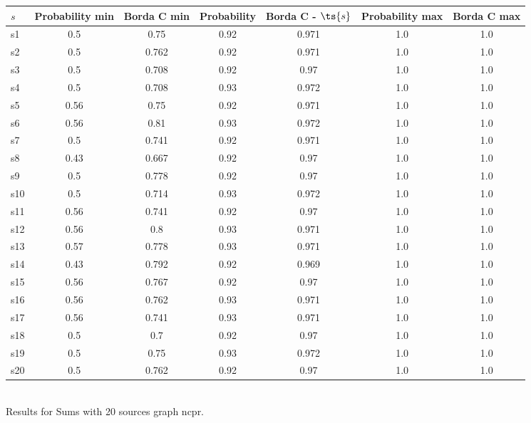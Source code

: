 \documentclass{article}
\begin{document}
\noindent\begin{tabular}{|l|c|c|c|c|c|c|}
\hline
$s$& Probability min & Borda C min & Probability & Borda C - $\ts{s}$ & Probability max & Borda C max\\
\hline
s1 &0.5 & 0.75 & 0.92 & 0.971 & 1.0 & 1.0\\
\hline
s2 &0.5 & 0.762 & 0.92 & 0.971 & 1.0 & 1.0\\
\hline
s3 &0.5 & 0.708 & 0.92 & 0.97 & 1.0 & 1.0\\
\hline
s4 &0.5 & 0.708 & 0.93 & 0.972 & 1.0 & 1.0\\
\hline
s5 &0.56 & 0.75 & 0.92 & 0.971 & 1.0 & 1.0\\
\hline
s6 &0.56 & 0.81 & 0.93 & 0.972 & 1.0 & 1.0\\
\hline
s7 &0.5 & 0.741 & 0.92 & 0.971 & 1.0 & 1.0\\
\hline
s8 &0.43 & 0.667 & 0.92 & 0.97 & 1.0 & 1.0\\
\hline
s9 &0.5 & 0.778 & 0.92 & 0.97 & 1.0 & 1.0\\
\hline
s10 &0.5 & 0.714 & 0.93 & 0.972 & 1.0 & 1.0\\
\hline
s11 &0.56 & 0.741 & 0.92 & 0.97 & 1.0 & 1.0\\
\hline
s12 &0.56 & 0.8 & 0.93 & 0.971 & 1.0 & 1.0\\
\hline
s13 &0.57 & 0.778 & 0.93 & 0.971 & 1.0 & 1.0\\
\hline
s14 &0.43 & 0.792 & 0.92 & 0.969 & 1.0 & 1.0\\
\hline
s15 &0.56 & 0.767 & 0.92 & 0.97 & 1.0 & 1.0\\
\hline
s16 &0.56 & 0.762 & 0.93 & 0.971 & 1.0 & 1.0\\
\hline
s17 &0.56 & 0.741 & 0.93 & 0.971 & 1.0 & 1.0\\
\hline
s18 &0.5 & 0.7 & 0.92 & 0.97 & 1.0 & 1.0\\
\hline
s19 &0.5 & 0.75 & 0.93 & 0.972 & 1.0 & 1.0\\
\hline
s20 &0.5 & 0.762 & 0.92 & 0.97 & 1.0 & 1.0\\
\hline
\end{tabular}\\

\noindent Results for Sums with 20 sources graph ncpr.
\end{document}
